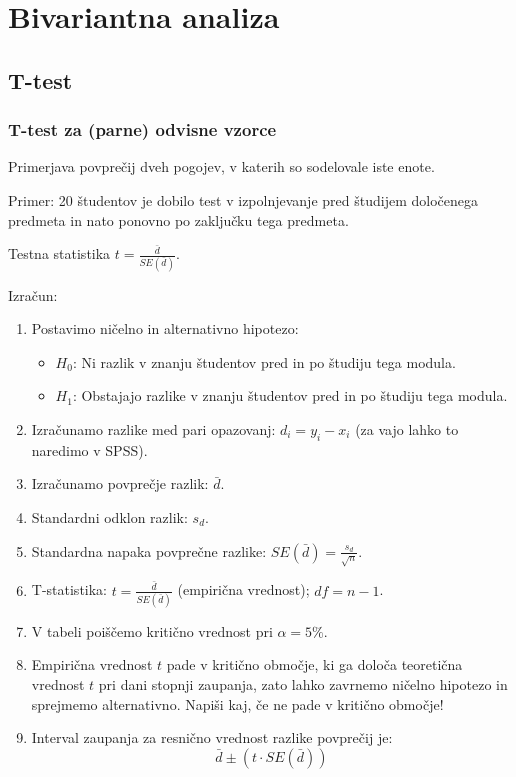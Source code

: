 \chapter{Bivariantna analiza}

\section{T-test}

\subsection{T-test za (parne) odvisne vzorce}

Primerjava povprečij dveh pogojev, v katerih so sodelovale iste enote.

Primer: 20 študentov je dobilo test v izpolnjevanje pred študijem določenega predmeta in nato ponovno po zaključku tega predmeta.

Testna statistika $t=\frac{\bar{d}}{SE(\bar{d})}$.

Izračun:

\begin{enumerate}
    \item Postavimo ničelno in alternativno hipotezo:
        \begin{itemize}
            \item $H_0$: Ni razlik v znanju študentov pred in po študiju tega modula.
            \item $H_1$: Obstajajo razlike v znanju študentov pred in po študiju tega modula.
        \end{itemize}
    \item Izračunamo razlike med pari opazovanj: $d_i = y_i - x_i$ (za vajo lahko to naredimo v SPSS).
    \item Izračunamo povprečje razlik: $\bar{d}$.
    \item Standardni odklon razlik: $s_d$.
    \item Standardna napaka povprečne razlike: $SE(\bar{d}) = \frac{s_d}{\sqrt{n}}$.
    \item T-statistika: $t = \frac{\bar{d}}{SE(\bar{d})}$ (empirična vrednost); $df = n-1$.
    \item V tabeli poiščemo kritično vrednost pri $\alpha = 5\%$.
    \item Empirična vrednost $t$ pade v kritično območje, ki ga določa teoretična vrednost $t$ pri dani stopnji zaupanja, zato lahko zavrnemo ničelno hipotezo in sprejmemo alternativno. Napiši kaj, če ne pade v kritično območje!
    \item Interval zaupanja za resnično vrednost razlike povprečij je: 
        \[\bar{d} \pm (t \cdot SE(\bar{d}))\]
\end{enumerate}

